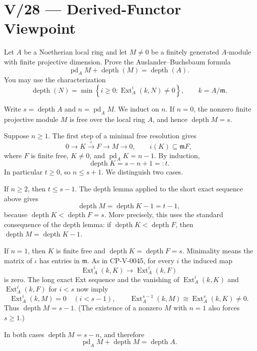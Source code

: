 \section*{V/28 --- Derived-Functor Viewpoint}

\begin{problem}[CP-V-0044]
\label{prob:cp-v-0044}
Let \(A\) be a Noetherian local ring and let \(M\ne0\) be a finitely generated
\(A\)-module with finite projective dimension. Prove the
Auslander--Buchsbaum formula
\[
\operatorname{pd}_A M+\operatorname{depth}(M)
=
\operatorname{depth}(A).
\]
You may use the characterization
\[
\operatorname{depth}(N)
=
\min\left\{
i\ge0:
\operatorname{Ext}_A^i(k,N)\ne0
\right\},
\qquad
k=A/\mathfrak m.
\]
\end{problem}

\begin{solution}
Write $s=\operatorname{depth}A$ and $n=\operatorname{pd}_A M$.
We induct on $n$. If $n=0$, the nonzero finite projective module
$M$ is free over the local ring $A$, and hence
$\operatorname{depth}M=s$.

Suppose $n\geq1$. The first step of a minimal free resolution gives
\[
0\longrightarrow K\xrightarrow{\,\iota\,}F
\longrightarrow M\longrightarrow0,
\qquad \iota(K)\subseteq\mathfrak m F,
\]
where $F$ is finite free, $K\neq0$, and
$\operatorname{pd}_A K=n-1$. By induction,
\[
\operatorname{depth}K=s-n+1=:t.
\]
In particular $t\geq0$, so $n\leq s+1$. We distinguish two cases.

If $n\geq2$, then $t\leq s-1$. The depth lemma applied to the
short exact sequence above gives
\[
\operatorname{depth}M=\operatorname{depth}K-1=t-1,
\]
because $\operatorname{depth}K<\operatorname{depth}F=s$.
More precisely, this uses the standard consequence of the depth lemma:
if $\operatorname{depth}K<\operatorname{depth}F$, then
$\operatorname{depth}M=\operatorname{depth}K-1$.

If $n=1$, then $K$ is finite free and
$\operatorname{depth}K=\operatorname{depth}F=s$.
Minimality means the matrix of $\iota$ has entries in $\mathfrak m$.
As in CP-V-0045, for every $i$ the induced map
\[
\operatorname{Ext}_A^i(k,K)\longrightarrow
\operatorname{Ext}_A^i(k,F)
\]
is zero. The long exact Ext sequence and the vanishing of
$\operatorname{Ext}_A^i(k,K)$ and $\operatorname{Ext}_A^i(k,F)$
for $i<s$ now imply
\[
\operatorname{Ext}_A^i(k,M)=0\quad(i<s-1),
\qquad
\operatorname{Ext}_A^{s-1}(k,M)
\cong\operatorname{Ext}_A^s(k,K)\ne0.
\]
Thus $\operatorname{depth}M=s-1$.
(The existence of a nonzero $M$ with $n=1$ also forces $s\geq1$.)

In both cases $\operatorname{depth}M=s-n$, and therefore
\[
\boxed{\operatorname{pd}_A M+\operatorname{depth}M
=\operatorname{depth}A.}
\]
\end{solution}


